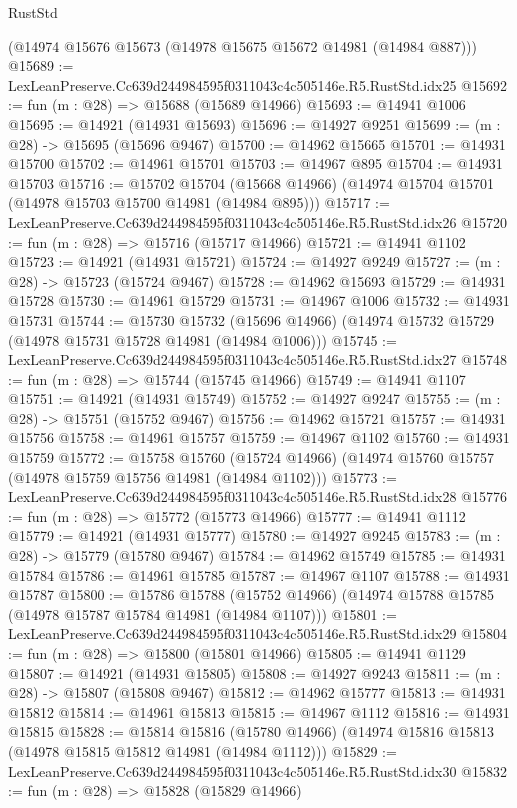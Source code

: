 \begin{lexlean}{RustStd}
\begin{coremodule}
    (@14974 @15676 @15673 (@14978 @15675 @15672 @14981 (@14984 @887)))
@15689 := LexLeanPreserve.Cc639d244984595f0311043c4c505146e.R5.RustStd.idx25
@15692 := fun (m : @28) => @15688 (@15689 @14966)
@15693 := @14941 @1006
@15695 := @14921 (@14931 @15693)
@15696 := @14927 @9251
@15699 := (m : @28) -> @15695 (@15696 @9467)
@15700 := @14962 @15665
@15701 := @14931 @15700
@15702 := @14961 @15701
@15703 := @14967 @895
@15704 := @14931 @15703
@15716 := @15702
    @15704
    (@15668 @14966)
    (@14974 @15704 @15701 (@14978 @15703 @15700 @14981 (@14984 @895)))
@15717 := LexLeanPreserve.Cc639d244984595f0311043c4c505146e.R5.RustStd.idx26
@15720 := fun (m : @28) => @15716 (@15717 @14966)
@15721 := @14941 @1102
@15723 := @14921 (@14931 @15721)
@15724 := @14927 @9249
@15727 := (m : @28) -> @15723 (@15724 @9467)
@15728 := @14962 @15693
@15729 := @14931 @15728
@15730 := @14961 @15729
@15731 := @14967 @1006
@15732 := @14931 @15731
@15744 := @15730
    @15732
    (@15696 @14966)
    (@14974 @15732 @15729 (@14978 @15731 @15728 @14981 (@14984 @1006)))
@15745 := LexLeanPreserve.Cc639d244984595f0311043c4c505146e.R5.RustStd.idx27
@15748 := fun (m : @28) => @15744 (@15745 @14966)
@15749 := @14941 @1107
@15751 := @14921 (@14931 @15749)
@15752 := @14927 @9247
@15755 := (m : @28) -> @15751 (@15752 @9467)
@15756 := @14962 @15721
@15757 := @14931 @15756
@15758 := @14961 @15757
@15759 := @14967 @1102
@15760 := @14931 @15759
@15772 := @15758
    @15760
    (@15724 @14966)
    (@14974 @15760 @15757 (@14978 @15759 @15756 @14981 (@14984 @1102)))
@15773 := LexLeanPreserve.Cc639d244984595f0311043c4c505146e.R5.RustStd.idx28
@15776 := fun (m : @28) => @15772 (@15773 @14966)
@15777 := @14941 @1112
@15779 := @14921 (@14931 @15777)
@15780 := @14927 @9245
@15783 := (m : @28) -> @15779 (@15780 @9467)
@15784 := @14962 @15749
@15785 := @14931 @15784
@15786 := @14961 @15785
@15787 := @14967 @1107
@15788 := @14931 @15787
@15800 := @15786
    @15788
    (@15752 @14966)
    (@14974 @15788 @15785 (@14978 @15787 @15784 @14981 (@14984 @1107)))
@15801 := LexLeanPreserve.Cc639d244984595f0311043c4c505146e.R5.RustStd.idx29
@15804 := fun (m : @28) => @15800 (@15801 @14966)
@15805 := @14941 @1129
@15807 := @14921 (@14931 @15805)
@15808 := @14927 @9243
@15811 := (m : @28) -> @15807 (@15808 @9467)
@15812 := @14962 @15777
@15813 := @14931 @15812
@15814 := @14961 @15813
@15815 := @14967 @1112
@15816 := @14931 @15815
@15828 := @15814
    @15816
    (@15780 @14966)
    (@14974 @15816 @15813 (@14978 @15815 @15812 @14981 (@14984 @1112)))
@15829 := LexLeanPreserve.Cc639d244984595f0311043c4c505146e.R5.RustStd.idx30
@15832 := fun (m : @28) => @15828 (@15829 @14966)

\end{coremodule}
\end{lexlean}
